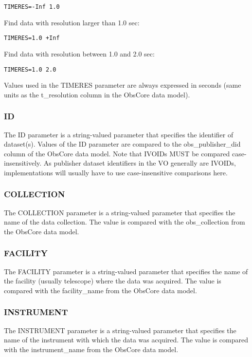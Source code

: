 \documentclass[11pt,a4paper]{ivoa}
\begin{document}
\begin{lstlisting}
TIMERES=-Inf 1.0
\end{lstlisting}
Find data with resolution larger than 1.0 sec:

\begin{lstlisting}
TIMERES=1.0 +Inf
\end{lstlisting}
Find data with resolution between 1.0 and 2.0 sec:

\begin{lstlisting}
TIMERES=1.0 2.0
\end{lstlisting}

Values used in the TIMERES parameter are always expressed in seconds (same units as the t\_resolution column in the ObsCore  data model).

\subsubsection{ID}
\label{sec:ID}
The ID parameter is a string-valued parameter that specifies the identifier of dataset(s). Values of the ID parameter are compared to the obs\_publisher\_did column of the ObsCore data model. Note that IVOIDs MUST be compared case-insensitively. As publisher dataset identifiers in the VO generally are IVOIDs, implementations will usually have to use case-insensitive comparisons here.

\subsubsection{COLLECTION}
The COLLECTION parameter is a string-valued parameter that specifies the name of the data collection. The value is compared with the obs\_collection from the ObsCore  data model.

\subsubsection{FACILITY}
The FACILITY parameter is a string-valued parameter that specifies the name of the facility (usually telescope) where the data was acquired. The value is compared with the facility\_name from the ObsCore data model.

\subsubsection{INSTRUMENT}
The INSTRUMENT parameter is a string-valued parameter that specifies the name of the instrument with which the data was acquired. The value is compared with the instrument\_name from the ObsCore data model.
\end{document}
